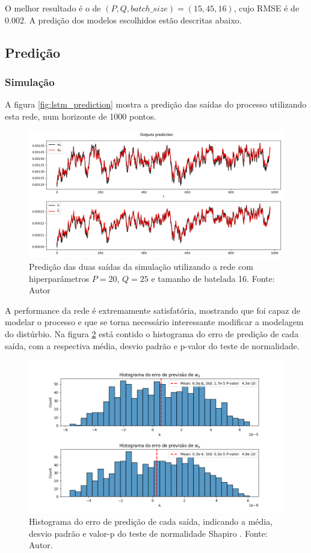 O melhor resultado é o de $(P,Q,batch\_size)=(15,45,16)$, cujo RMSE é de 0.002. A predição dos modelos escolhidos estão descritas abaixo.

\subsection{Predição}
\subsubsection{Simulação}
A figura \ref{fig:lstm_prediction} mostra a predição das saídas do processo utilizando esta rede, num horizonte de 1000 pontos.
\begin{figure}[hbt!]
    \centering
    \includegraphics[width=0.7\linewidth]{Imagens/chap04/simulation_lstm_prediction.png}
    \caption{Predição das duas saídas da simulação utilizando a rede com hiperparâmetros $P=20$, $Q=25$ e tamanho de batelada 16. Fonte: Autor}
    \label{fig:sim_lstm_prediction}
\end{figure}

A performance da rede é extremamente satisfatória, mostrando que foi capaz de modelar o processo e que se torna necessário interessante modificar a modelagem do distúrbio. Na figura \ref{fig:sim_error_histogram} está contido o histograma do erro de predição de cada saída, com a respectiva média, desvio padrão e p-valor do teste de normalidade.

\begin{figure}[hbt!]
    \centering
    \includegraphics[width=0.7\linewidth]{Imagens/chap04/simulation_error_histogram.png}
    \caption{Histograma do erro de predição de cada saída, indicando a média, desvio padrão e valor-p do teste de normalidade Shapiro \cite{shapiro1965analysis}. Fonte: Autor.}
    \label{fig:sim_error_histogram}
\end{figure}

